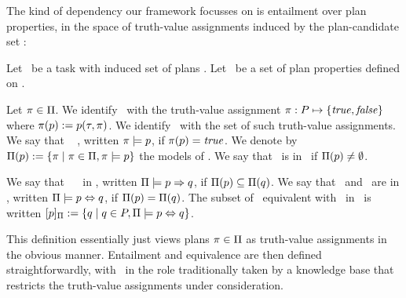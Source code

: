 The kind of dependency our framework focusses on is entailment over
plan properties, in the space of truth-value assignments induced by
the plan-candidate set \plans:

\begin{definition}[Entailment]
Let \task\ be a task with induced set of plans \plans. Let \props\ be
a set of plan properties defined on \task.

Let $\pi \in \Pi$. We identify \plan\ with the truth-value
assignment $\pi : P \mapsto \{\mathit{true}, \mathit{false}\}$ where
$\pi(p) := p(\tau,\pi)$. We identify \plans\ with the set
of such truth-value assignments. We say that
\plan\  \prop, written $\pi \models p$, if
$\pi(p) = \mathit{true}$. We denote by $\Pi(p) :=
\{\pi \mid \pi \in \Pi, \pi \models p\}$ the models of
\prop. We say that \prop\ is  in \plans\ if
$\Pi(p) \neq \emptyset$.

We say that \prop\  \propq\ in \plans, written
$\Pi \models p \Rightarrow q$, if $\Pi(p)
\subseteq \Pi(q)$.
%
We say that \prop\ and \propq\ are  in \plans,
written $\Pi \models p \Leftrightarrow q$, if $\Pi(p) =
\Pi(q)$. The subset of \props\ equivalent with
\prop\ in \plans\ is written $[p]_{\Pi} := \{q \mid
q \in P, \Pi \models p \Leftrightarrow q\}$.
\end{definition}

This definition essentially just views plans $\pi \in \Pi$ as
truth-value assignments in the obvious manner. Entailment and
equivalence are then defined straightforwardly, with \plans\ in the
role traditionally taken by a knowledge base that restricts the
truth-value assignments under consideration.

